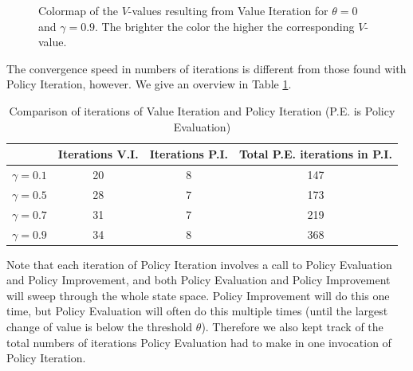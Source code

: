 \documentclass{article}
\begin{document}
\begin{figure}[htb]
        \caption{\label{colormapValueIteration} Colormap of the $V$-values  resulting from Value 
        		Iteration for $\theta=0$ and $\gamma = 0.9$. \newline
        		The brighter the color the higher the corresponding $V$-value.}
\end{figure}

The convergence speed in numbers of iterations is different from those found with Policy Iteration, however. We give an overview in Table \ref{tab:policyEvaluationValues}.

\begin{table}[htb]
\centering
\begin{tabular}{|c|c|c|c|}
\hline 
 & Iterations V.I. & Iterations P.I.  & Total P.E. iterations in P.I. \\ 
\hline 
$\gamma = 0.1 $ & 20 & 8 & 147\\ 
\hline 
$\gamma = 0.5 $ & 28 & 7 & 173\\ 
\hline 
$\gamma = 0.7 $  & 31 & 7 &219 \\ 
\hline 
$\gamma = 0.9 $ & 34 & 8 & 368\\ 
\hline 
\end{tabular}
\caption{Comparison of iterations of Value Iteration and Policy Iteration (P.E. is Policy Evaluation)}
\label{tab:policyEvaluationValues} 
\end{table}

Note that each iteration of Policy Iteration involves a call to Policy Evaluation and Policy Improvement, and both Policy Evaluation and Policy Improvement will sweep through the whole state space. Policy Improvement will do this one time, but Policy Evaluation will often do this multiple times (until the largest change of value is below the threshold $\theta$). Therefore we also kept track of the total numbers of iterations Policy Evaluation had to make in one invocation of Policy Iteration. 
\end{document}
